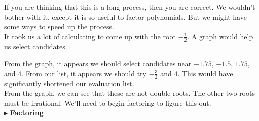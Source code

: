 \documentclass{ximera}
\begin{document}
If you are thinking that this is a long process, then you are correct.  We wouldn't bother with it, except it is so useful to factor polynomials.  But we might have some ways to speed up the process.  \\

It took us a lot of calculating to come up with the root $-\frac{1}{2}$.  A graph would help us select candidates.


\begin{center}
\end{center}


From the graph, it appears we should select candidates near $-1.75$, $-1.5$, $1.75$, and $4$.  From our list, it appears we should try $-\frac{3}{2}$ and $4$. This would have significantly shortened our evaluation list.  \\

From the graph, we can see that these are not double roots. The other two roots must be irrational.  We'll need to begin factoring to figure this out. \\



$\blacktriangleright$ \textbf{Factoring}
\end{document}
